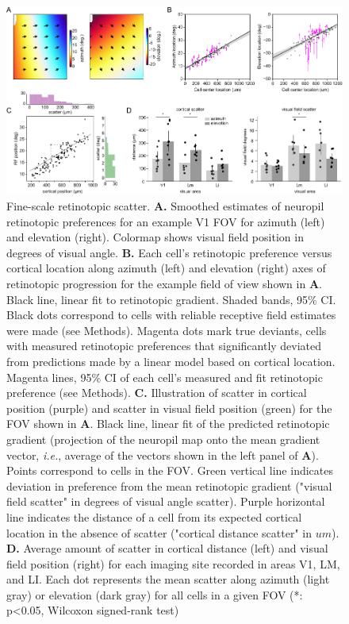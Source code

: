 \begin{figure}[t!]
    \includegraphics[width=\textwidth]{figures/chapter_3/fig_3-4_retino_scatter/fig_3-4_retino_scatter.pdf}
    \vspace{.1in}
    \caption[Fine-scale retinotopic scatter]{Fine-scale retinotopic scatter. 
    \textbf{A.} Smoothed estimates of neuropil retinotopic preferences for an example V1 FOV for azimuth (left) and elevation (right). Colormap shows visual field position in degrees of visual angle.
    \textbf{B.} Each cell's retinotopic preference versus cortical location along azimuth (left) and elevation (right) axes of retinotopic progression for the example field of view shown in \textbf{A}. Black line, linear fit to retinotopic gradient. Shaded bands, 95\% CI. Black dots correspond to cells with reliable receptive field estimates were made (see Methods). Magenta dots mark true deviants, cells with measured retinotopic preferences that significantly deviated from predictions made by a linear model based on cortical location. Magenta lines, 95\% CI of each cell's measured and fit retinotopic preference (see Methods). 
    \textbf{C.} Illustration of scatter in cortical position (purple) and scatter in visual field position (green) for the FOV shown in \textbf{A}. Black line, linear fit of the predicted retinotopic gradient (projection of the neuropil map onto the mean gradient vector, \textit{i.e.}, average of the vectors shown in the left panel of \textbf{A}). Points correspond to cells in the FOV. Green vertical line indicates deviation in preference from the mean retinotopic gradient ("visual field scatter" in degrees of visual angle scatter). Purple horizontal line indicates the distance of a cell from its expected cortical location in the absence of scatter ("cortical distance scatter" in $um$). 
    \textbf{D.} Average amount of scatter in cortical distance (left) and visual field position (right) for each imaging site recorded in areas V1, LM, and LI. Each dot represents the mean scatter along azimuth (light gray) or elevation (dark gray) for all cells in a given FOV (*: p<0.05, Wilcoxon signed-rank test)
    \label{fig:retino_scatter}}
\end{figure}

